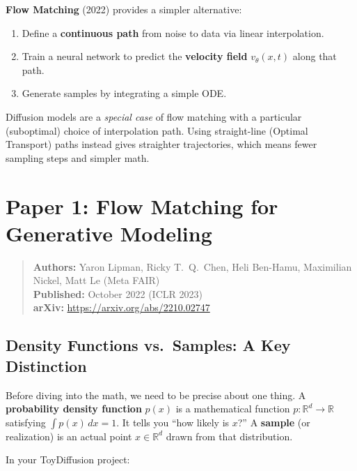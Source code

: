 \documentclass[11pt, a4paper]{article}
\newcommand{\vtheta}{v_\theta}
\newcommand{\R}{\mathbb{R}}
\begin{document}
\textbf{Flow Matching} (2022) provides a simpler alternative:

\begin{enumerate}
  \item Define a \textbf{continuous path} from noise to data via linear
        interpolation.
  \item Train a neural network to predict the \textbf{velocity field}
        $\vtheta(x,t)$ along that path.
  \item Generate samples by integrating a simple ODE.
\end{enumerate}

\begin{keyinsight}
Diffusion models are a \emph{special case} of flow matching with a particular
(suboptimal) choice of interpolation path.  Using straight-line (Optimal
Transport) paths instead gives straighter trajectories, which means fewer
sampling steps and simpler math.
\end{keyinsight}

\section{Paper 1: Flow Matching for Generative Modeling}
\label{sec:paper1}

\begin{quote}
\textbf{Authors:} Yaron Lipman, Ricky T.~Q.~Chen, Heli Ben-Hamu,
Maximilian Nickel, Matt Le (Meta FAIR) \\
\textbf{Published:} October 2022 (ICLR 2023) \\
\textbf{arXiv:} \url{https://arxiv.org/abs/2210.02747}
\end{quote}

\subsection{Density Functions vs.\ Samples: A Key Distinction}
\label{sec:density-vs-samples}

Before diving into the math, we need to be precise about one thing.
A \textbf{probability density function} $p(x)$ is a mathematical function
$p: \R^d \to \R$ satisfying $\int p(x)\,dx = 1$.  It tells you ``how likely
is $x$?''  A \textbf{sample} (or realization) is an actual point
$x \in \R^d$ drawn from that distribution.

In your ToyDiffusion project:
\end{document}
